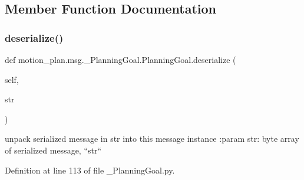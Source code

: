 \subsection{Member Function Documentation}
\mbox{\label{classmotion__plan_1_1msg_1_1__PlanningGoal_1_1PlanningGoal_adffcada0f6843d09f27655ac73d0dff9}} 
\subsubsection{\texorpdfstring{deserialize()}{deserialize()}}
{\footnotesize\ttfamily def motion\+\_\+plan.\+msg.\+\_\+\+Planning\+Goal.\+Planning\+Goal.\+deserialize (\begin{DoxyParamCaption}\item[{}]{self,  }\item[{}]{str }\end{DoxyParamCaption})}

\begin{DoxyVerb}unpack serialized message in str into this message instance
:param str: byte array of serialized message, ``str``
\end{DoxyVerb}
 

Definition at line 113 of file \+\_\+\+Planning\+Goal.\+py.


